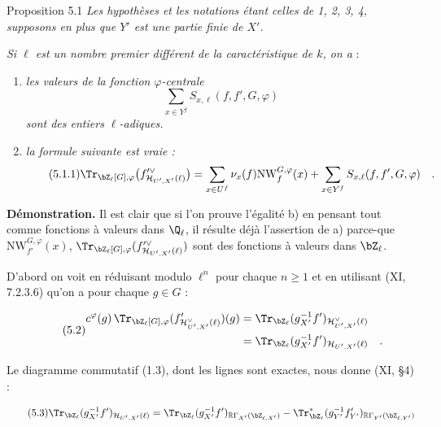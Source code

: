 \begin{statement}{Proposition 5.1}
\emph{Les hypothèses et les notations étant celles de 1, 2, 3, 4, supposons en plus que $Y'$ est une partie finie de $X'$.}

\emph{Si $\ell$ est un nombre premier différent de la caractéristique de $k$, on a} :
\begin{enumerate}[label=\alph*)]
\item \emph{les valeurs de la fonction $\varphi$-centrale}
\[
\sum_{x\in Y^f} S_{x,\ell}(f,f',G,\varphi)
\]
\emph{sont des entiers $\ell$-adiques.}
\item \emph{la formule suivante est vraie :}
\begin{equation}\tag{5.1.1}
\Tr_{\bZ_\ell[G],\varphi}\bigl(f'^\vee_{\mathcal{H}_{U',X'}(\ell)}\bigr)
= \sum_{x\in U^f}\nu_x(f)\mathrm{NW}^{G,\varphi}_f(x)+\sum_{x\in Y^f}S_{x,\ell}(f,f',G,\varphi) \quad .
\end{equation}
\end{enumerate}
\end{statement}

\noindent
\textbf{Démonstration.} Il est clair que si l'on prouve l'égalité b) en pensant tout comme fonctions à valeurs dans $\Q_\ell$, il résulte déjà l'assertion de a) parce-que $\mathrm{NW}^{G,\varphi}_{f'}(x)$, $\Tr_{\bZ_\ell[G],\varphi}(f'^\vee_{\mathcal{H}_{U',X'}(\ell)})$ sont des fonctions à valeurs dans $\bZ_\ell$.

D'abord on voit en réduisant modulo $\ell^n$ pour chaque $n \geq 1$ et en utilisant (XI, 7.2.3.6) qu'on a pour chaque $g \in G$ :

\begin{equation}\tag{5.2}
\begin{aligned}
c^\varphi(g) \, \Tr_{\bZ_\ell[G],\varphi}(f'_{\mathcal{H}^\vee_{U',X'}(\ell)})(g)
&= \Tr_{\bZ_\ell}(g_{X'}^{-1}f')_{\mathcal{H}^\vee_{U',X'}(\ell)}\\
&= \Tr_{\bZ_\ell}(g_{X'}^{-1}f')_{\mathcal{H}_{U',X'}(\ell)} \quad .
\end{aligned}
\end{equation}

Le diagramme commutatif (1.3), dont les lignes sont exactes, nous donne (XI, \S4) :

\begin{equation}\tag{5.3}
\Tr_{\bZ_\ell}(g_{X'}^{-1}f')_{\mathcal{H}_{U',X'}(\ell)} = \Tr_{\bZ_\ell}(g_{X'}^{-1}f')_{\mathbb{R}\Gamma_{X'}(\bZ_{\ell,X'})} - \Tr^*_{\bZ_\ell}(g_{Y'}^{-1}f'_{Y'})_{\mathbb{R}\Gamma_{Y'}(\bZ_{\ell,Y'})}
\end{equation}

